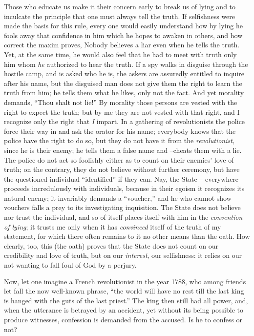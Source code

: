 Those who educate us make it their concern early to break us of lying and to 
inculcate the principle that one must always tell the truth. If selfishness 
were made the basis for this rule, every one would easily understand how by 
lying he fools away that confidence in him which he hopes to awaken in others, 
and how correct the maxim proves, Nobody believes a liar even when he tells 
the truth. Yet, at the same time, he would also feel that he had to meet with 
truth only him whom \textit{he} authorized to hear the truth. If a spy walks 
in disguise through the hostile camp, and is asked who he is, the askers are 
assuredly entitled to inquire after his name, but the disguised man does not 
give them the right to learn the truth from him; he tells them what he likes, 
only not the fact. And yet morality demands, ``Thou shalt not lie!'' By 
morality those persons are vested with the right to expect the truth; but by 
me they are not vested with that right, and I recognize only the right that 
\textit{I} impart. In a gathering of revolutionists the police force their way 
in and ask the orator for his name; everybody knows that the police have the 
right to do so, but they do not have it from the \textit{revolutionist}, since 
he is their enemy; he tells them a false name and --cheats them with a lie. 
The police do not act so foolishly either as to count on their enemies' love 
of truth; on the contrary, they do not believe without further ceremony, but 
have the questioned individual ``identified'' if they can. Nay, the State -- 
everywhere proceeds incredulously with individuals, because in their egoism it 
recognizes its natural enemy; it invariably demands a ``voucher,'' and he 
who cannot show vouchers falls a prey to its investigating inquisition. The 
State does not believe nor trust the individual, and so of itself places 
itself with him in the \textit{convention of lying}; it trusts me only when it 
has \textit{convinced} itself of the truth of my statement, for which there 
often remains to it no other means than the oath. How clearly, too, this (the 
oath) proves that the State does not count on our credibility and love of 
truth, but on our \textit{interest}, our selfishness: it relies on our not 
wanting to fall foul of God by a perjury.

Now, let one imagine a French revolutionist in the year 1788, who among 
friends let fall the now well-known phrase, ``the world will have no rest 
till the last king is hanged with the guts of the last priest.'' The king 
then still had all power, and, when the utterance is betrayed by an accident, 
yet without its being possible to produce witnesses, confession is demanded 
from the accused. Is he to confess or not?

